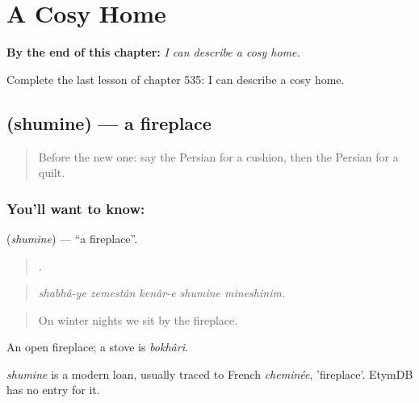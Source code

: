 
\chapter{A Cosy Home}
\label{ch:fa-a-cosy-home}

\begin{chapteropening}
\textbf{By the end of this chapter:} \emph{I can describe a cosy home.}

Complete the last lesson of chapter 535: I can describe a cosy home.
\end{chapteropening}

\section[\texorpdfstring{\fa{شومینه} (shumine)}{شومینه (shumine)}]{ (shumine) — a fireplace}

\label{lesson:FA-C535-shumine}



\begin{quote}
Before the new one: say the Persian for a cushion, then the Persian for a quilt.
\end{quote}

\subsection*{You'll want to know: }
\textbf{} (\emph{shumine}) — \textquotedblleft{}a fireplace\textquotedblright{}.

\begin{quote}
    .
\end{quote}

\begin{quote}
\emph{shabhâ-ye zemestân kenâr-e shumine mineshinim.}
\end{quote}

\begin{quote}
On winter nights we sit by the fireplace.
\end{quote}

An open fireplace; a stove is \emph{bokhâri}.

\begin{cousinweb}
\emph{shumine} is a modern loan, usually traced to French \emph{cheminée}, 'fireplace'. EtymDB has no entry for it.
\end{cousinweb}

